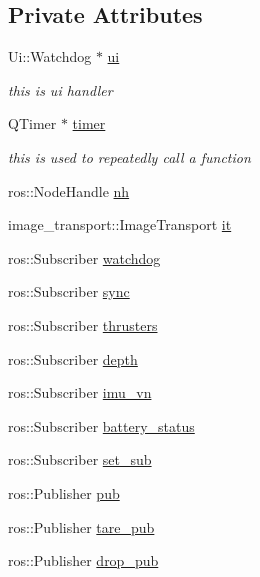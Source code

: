\subsection*{Private Attributes}
\begin{DoxyCompactItemize}
\item 
Ui\+::\+Watchdog $\ast$ \hyperlink{classWatchdog_ad0634f3e34a6fc2ec3ea75bd6663424f}{ui}
\begin{DoxyCompactList}\small\item\em this is ui handler \end{DoxyCompactList}\item 
Q\+Timer $\ast$ \hyperlink{classWatchdog_a886f884484aeca77cfaa9b5aec0b9b07}{timer}
\begin{DoxyCompactList}\small\item\em this is used to repeatedly call a function \end{DoxyCompactList}\item 
ros\+::\+Node\+Handle \hyperlink{classWatchdog_a5e56a5d0f399c2afabe14bc9e4f96a8b}{nh}
\item 
image\+\_\+transport\+::\+Image\+Transport \hyperlink{classWatchdog_a974840a83972203cd2cbcf34f9b08907}{it}
\item 
ros\+::\+Subscriber \hyperlink{classWatchdog_a2c665ae63c37aecfc70a287b42adf80a}{watchdog}
\item 
ros\+::\+Subscriber \hyperlink{classWatchdog_a9bd9eaa642ad04673708373aa3f68fcb}{sync}
\item 
ros\+::\+Subscriber \hyperlink{classWatchdog_a5c5b6fbb004f5bf8f7dbfe46973a66f7}{thrusters}
\item 
ros\+::\+Subscriber \hyperlink{classWatchdog_a56ae43e347332d9ce2b2cf607433aa26}{depth}
\item 
ros\+::\+Subscriber \hyperlink{classWatchdog_a8081086de57c6ebaf9a536928d993501}{imu\+\_\+vn}
\item 
ros\+::\+Subscriber \hyperlink{classWatchdog_aeb97b46f2a7da7f47b8f70bb71e44c5d}{battery\+\_\+status}
\item 
ros\+::\+Subscriber \hyperlink{classWatchdog_a23164f406d9d4b1418118da6b861e5dc}{set\+\_\+sub}
\item 
ros\+::\+Publisher \hyperlink{classWatchdog_ab57c2f5ba02206d982d885c65d1bad2c}{pub}
\item 
ros\+::\+Publisher \hyperlink{classWatchdog_af6dc2c82d9da2d747a0a7230773a9e21}{tare\+\_\+pub}
\item 
ros\+::\+Publisher \hyperlink{classWatchdog_aa347b0561e507570cb5f6fdfe5ae8770}{drop\+\_\+pub}

\end{DoxyCompactItemize}

